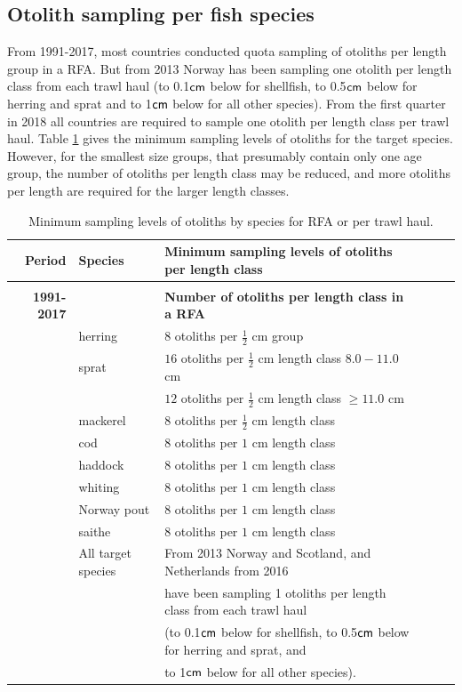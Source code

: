\documentclass[a4paper 12pt]{article}
\numberwithin{equation}{section}
\newcommand{\cm}{\textnormal{\sffamily cm}\xspace}
\begin{document}
\begin{appendices}
\section{\large Otolith sampling per fish species}
\label{secAp:otolithappendix}
From 1991-2017, most countries conducted quota sampling of otoliths per length group in a RFA. But from 2013 Norway has been sampling one otolith per length class from each trawl haul (to 0.1$\cm$ below for shellfish, to 0.5$\cm$ below for herring and sprat and to 1$\cm$ below for all other species). From the first quarter in 2018 all countries are required to sample one otolith per length class per trawl haul.  Table \ref{otolithsTable} gives the minimum sampling levels of otoliths for the target species. However, for the smallest size groups, that presumably contain only one age group, the number of otoliths per length class may be reduced, and more otoliths per length are required for the larger length classes. \\
\begin{small}
\begin{table}[h!]
\centering
\caption{Minimum sampling levels of otoliths by species for RFA or per trawl haul.}
\label{otolithsTable}
\begin{tabularx}{\linewidth}{r l l l l X}
\toprule 
Period &  Species  & Minimum sampling levels of otoliths per length class    \\[0.7ex]
\midrule \\[0.1ex]
{\bf 1991-2017} & & {\bf Number of otoliths per length class in a RFA}  \\[1.8ex]
     & herring  &  $8$  otoliths per $\frac{1}{2}$ cm group \\[0.8ex]
     & sprat    & $16$  otoliths per $\frac{1}{2}$ cm length class  $8.0 -11.0$ cm\\[0.8ex]
              & & $12$  otoliths per $\frac{1}{2}$ cm length class  $\geq 11.0$ cm\\[0.8ex]
& mackerel      & $8$  otoliths per $\frac{1}{2}$ cm length class \\[0.8ex]
& cod       	  & $8$  otoliths per $1$ cm length class\\[0.8ex]
&haddock   	  & $8$  otoliths per $1$ cm length class \\[0.8ex]
&whiting    	  & $8$  otoliths per $1$ cm length class \\[0.8ex]
&Norway pout   & $8$  otoliths per $1$ cm length class\\[0.8ex]
&saithe        & $8$  otoliths per $1$ cm length class \\[2ex] 
& All target species      &  From 2013 Norway and Scotland, and  Netherlands from 2016 \\[0.7ex] 
&& have been sampling 1 otoliths per length class from each trawl haul \\[0.7ex] 
&& (to 0.1$\cm$ below for shellfish, to 0.5$\cm$ below for herring and sprat, and \\ [0.7ex] 
&& to 1$\cm$ below for all other species).\\[2.7ex] 


\end{tabularx}
\end{table}
\end{small}
\end{appendices}
\end{document}

